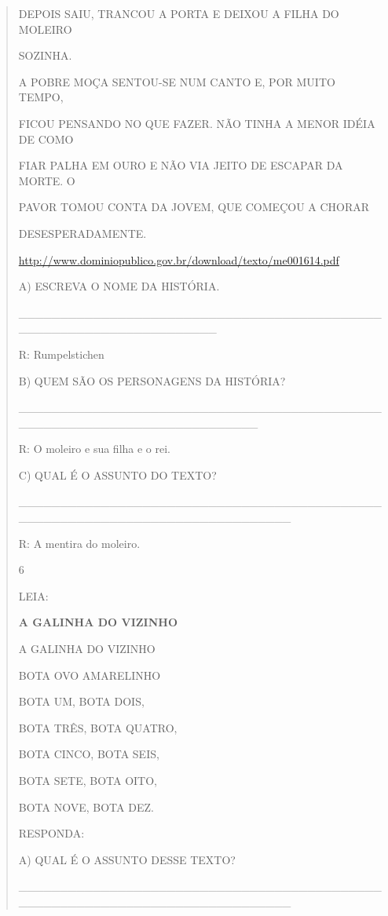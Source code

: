{{{{\begin{verse}
{{\begin{escolha}
{{{{DEPOIS SAIU, TRANCOU A PORTA E DEIXOU A FILHA DO MOLEIRO

SOZINHA.

A POBRE MOÇA SENTOU-SE NUM CANTO E, POR MUITO TEMPO,

FICOU PENSANDO NO QUE FAZER. NÃO TINHA A MENOR IDÉIA DE COMO

FIAR PALHA EM OURO E NÃO VIA JEITO DE ESCAPAR DA MORTE. O

PAVOR TOMOU CONTA DA JOVEM, QUE COMEÇOU A CHORAR

DESESPERADAMENTE.

\url{http://www.dominiopublico.gov.br/download/texto/me001614.pdf}

A) ESCREVA O NOME DA HISTÓRIA.

\_\_\_\_\_\_\_\_\_\_\_\_\_\_\_\_\_\_\_\_\_\_\_\_\_\_\_\_\_\_\_\_\_\_\_\_\_\_\_\_\_\_\_\_\_\_\_\_\_\_\_\_\_\_\_\_\_\_\_\_\_\_\_\_\_\_\_\_

R: Rumpelstichen

B) QUEM SÃO OS PERSONAGENS DA HISTÓRIA?

\_\_\_\_\_\_\_\_\_\_\_\_\_\_\_\_\_\_\_\_\_\_\_\_\_\_\_\_\_\_\_\_\_\_\_\_\_\_\_\_\_\_\_\_\_\_\_\_\_\_\_\_\_\_\_\_\_\_\_\_\_\_\_\_\_\_\_\_\_\_\_\_\_

R: O moleiro e sua filha e o rei.

C) QUAL É O ASSUNTO DO TEXTO?

\_\_\_\_\_\_\_\_\_\_\_\_\_\_\_\_\_\_\_\_\_\_\_\_\_\_\_\_\_\_\_\_\_\_\_\_\_\_\_\_\_\_\_\_\_\_\_\_\_\_\_\_\_\_\_\_\_\_\_\_\_\_\_\_\_\_\_\_\_\_\_\_\_\_\_\_\_

R: A mentira do moleiro.

\num{6}

LEIA:

\textbf{A GALINHA DO VIZINHO}

A GALINHA DO VIZINHO

BOTA OVO AMARELINHO

BOTA UM, BOTA DOIS,

BOTA TRÊS, BOTA QUATRO,

BOTA CINCO, BOTA SEIS,

BOTA SETE, BOTA OITO,

BOTA NOVE, BOTA DEZ.

RESPONDA:

A) QUAL É O ASSUNTO DESSE TEXTO?

\_\_\_\_\_\_\_\_\_\_\_\_\_\_\_\_\_\_\_\_\_\_\_\_\_\_\_\_\_\_\_\_\_\_\_\_\_\_\_\_\_\_\_\_\_\_\_\_\_\_\_\_\_\_\_\_\_\_\_\_\_\_\_\_\_\_\_\_\_\_\_\_\_\_\_\_\_

}}}}
\end{escolha}}}
\end{verse}}}}}
